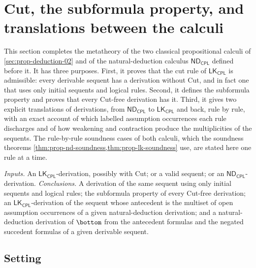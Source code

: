 \section{Cut, the subformula property, and translations between the calculi}
\label{sec:p02-w02b-p02-009-cut-translations}

This section completes the metatheory of the two classical propositional
calculi of \cref{sec:prop-deduction-02} and of the natural-deduction calculus
\(\mathsf{ND}_{\mathsf{CPL}}\) defined before it.  It has three purposes.
First, it proves that the cut rule of \(\mathsf{LK}_{\mathsf{CPL}}\) is
admissible: every derivable sequent has a derivation without Cut, and in fact
one that uses only initial sequents and logical rules.  Second, it defines
the subformula property and proves that every Cut-free derivation has it.
Third, it gives two explicit translations of derivations, from
\(\mathsf{ND}_{\mathsf{CPL}}\) to \(\mathsf{LK}_{\mathsf{CPL}}\) and back, rule
by rule, with an exact account of which labelled assumption occurrences each
rule discharges and of how weakening and contraction produce the
multiplicities of the sequents.  The rule-by-rule soundness cases of both
calculi, which the soundness theorems \cref{thm:prop-nd-soundness,thm:prop-lk-soundness}
use, are stated here one rule at a time.

\emph{Inputs.}  An \(\mathsf{LK}_{\mathsf{CPL}}\)-derivation, possibly with
Cut; or a valid sequent; or an \(\mathsf{ND}_{\mathsf{CPL}}\)-derivation.
\emph{Conclusions.}  A derivation of the same sequent using only initial
sequents and logical rules; the subformula property of every Cut-free
derivation; an \(\mathsf{LK}_{\mathsf{CPL}}\)-derivation of the sequent whose
antecedent is the multiset of open assumption occurrences of a given
natural-deduction derivation; and a natural-deduction derivation of
\(\bottom\) from the antecedent formulas and the negated succedent formulas
of a given derivable sequent.

\subsection{Setting}

